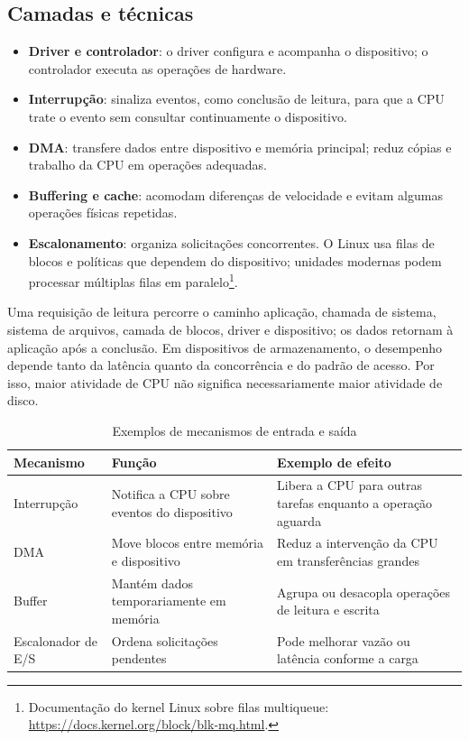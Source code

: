 \documentclass[12pt,a4paper,oneside]{article}
\begin{document}
\subsection{Camadas e técnicas}
\begin{itemize}
\item \textbf{Driver e controlador}: o driver configura e acompanha o dispositivo; o controlador executa as operações de hardware.
\item \textbf{Interrupção}: sinaliza eventos, como conclusão de leitura, para que a CPU trate o evento sem consultar continuamente o dispositivo.
\item \textbf{DMA}: transfere dados entre dispositivo e memória principal; reduz cópias e trabalho da CPU em operações adequadas.
\item \textbf{Buffering e cache}: acomodam diferenças de velocidade e evitam algumas operações físicas repetidas.
\item \textbf{Escalonamento}: organiza solicitações concorrentes. O Linux usa filas de blocos e políticas que dependem do dispositivo; unidades modernas podem processar múltiplas filas em paralelo\footnote{Documentação do kernel Linux sobre filas multiqueue: \url{https://docs.kernel.org/block/blk-mq.html}.}.
\end{itemize}
Uma requisição de leitura percorre o caminho aplicação, chamada de sistema, sistema de arquivos, camada de blocos, driver e dispositivo; os dados retornam à aplicação após a conclusão. Em dispositivos de armazenamento, o desempenho depende tanto da latência quanto da concorrência e do padrão de acesso. Por isso, maior atividade de CPU não significa necessariamente maior atividade de disco.

\begin{table}[htbp]\centering
\caption{Exemplos de mecanismos de entrada e saída}\label{tab:mecanismos-io}
\begin{tabular}{>{\raggedright\arraybackslash}p{3cm}p{5cm}p{5cm}}
\toprule Mecanismo & Função & Exemplo de efeito\\\midrule
Interrupção & Notifica a CPU sobre eventos do dispositivo & Libera a CPU para outras tarefas enquanto a operação aguarda\\
DMA & Move blocos entre memória e dispositivo & Reduz a intervenção da CPU em transferências grandes\\
Buffer & Mantém dados temporariamente em memória & Agrupa ou desacopla operações de leitura e escrita\\
Escalonador de E/S & Ordena solicitações pendentes & Pode melhorar vazão ou latência conforme a carga\\\bottomrule
\end{tabular}\end{table}
\end{document}
